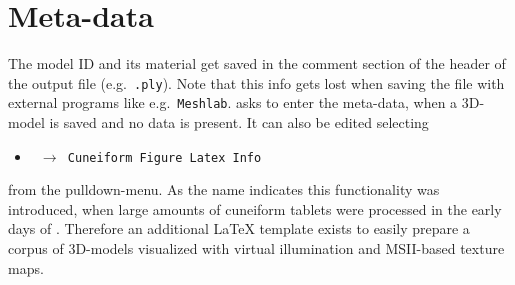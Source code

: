 \section{Meta-data}
\label{sec:metadata}

The model ID and its material get saved in the comment section of the header of the output file (e.g.~{\tt *.ply}). 
Note that this info gets lost when saving the file with external programs like e.g.~{\tt Meshlab}.
\GigaMesh asks to enter the meta-data, when a 3D-model is saved and no data is present.
It can also be edited selecting
\begin{itemize}
	\item[] \texttt{ $\rightarrow$ Cuneiform Figure Latex Info}
\end{itemize}
from the pulldown-menu. 
As the name indicates this functionality was introduced, when large amounts of cuneiform tablets were processed in the early days of \GigaMesh.
Therefore an additional \LaTeX{} template exists to easily prepare a corpus of 3D-models visualized with virtual illumination and MSII-based texture maps.

